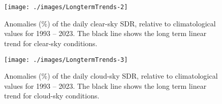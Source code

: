 
%
%
%
%



\appendixstart
\appendix
\section[\appendixname~\thesection]{}




\begin{figure}[h!]
    {\centering
        \texttt{[image: ./images/LongtermTrends-2]}

    }
    \caption{Anomalies (\%) of the daily clear-sky SDR, relative to climatological values for 1993 -- 2023. The black line shows the long term linear trend for clear-sky conditions.}\label{fig:trendCLEAR}
\end{figure}



\begin{figure}[h!]
    {\centering
        \texttt{[image: ./images/LongtermTrends-3]}

    }
    \caption{Anomalies (\%) of the daily cloud-sky SDR, relative to climatological values for 1993 -- 2023. The black line shows the long term linear trend for cloud-sky conditions.}\label{fig:trendCLOUD}
\end{figure}



